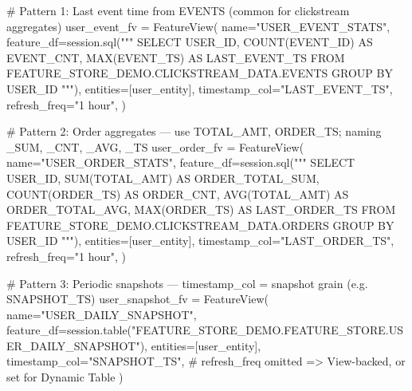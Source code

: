 \documentclass[
  letterpaper,
  DIV=11,
  numbers=noendperiod]{scrreprt}
\newenvironment{Shaded}{\begin{snugshade}}{\end{snugshade}}
\newcommand{\CommentTok}[1]{\textcolor[rgb]{0.37,0.37,0.37}{#1}}
\newcommand{\NormalTok}[1]{\textcolor[rgb]{0.00,0.23,0.31}{#1}}
\newcommand{\OperatorTok}[1]{\textcolor[rgb]{0.37,0.37,0.37}{#1}}
\newcommand{\StringTok}[1]{\textcolor[rgb]{0.13,0.47,0.30}{#1}}
\begin{document}
\begin{Shaded}
\begin{Highlighting}[]
\CommentTok{\# Pattern 1: Last event time from EVENTS (common for clickstream aggregates)}
\NormalTok{user\_event\_fv }\OperatorTok{=}\NormalTok{ FeatureView(}
\NormalTok{    name}\OperatorTok{=}\StringTok{"USER\_EVENT\_STATS"}\NormalTok{,}
\NormalTok{    feature\_df}\OperatorTok{=}\NormalTok{session.sql(}\StringTok{"""}
\StringTok{        SELECT}
\StringTok{            USER\_ID,}
\StringTok{            COUNT(EVENT\_ID) AS EVENT\_CNT,}
\StringTok{            MAX(EVENT\_TS) AS LAST\_EVENT\_TS}
\StringTok{        FROM FEATURE\_STORE\_DEMO.CLICKSTREAM\_DATA.EVENTS}
\StringTok{        GROUP BY USER\_ID}
\StringTok{    """}\NormalTok{),}
\NormalTok{    entities}\OperatorTok{=}\NormalTok{[user\_entity],}
\NormalTok{    timestamp\_col}\OperatorTok{=}\StringTok{"LAST\_EVENT\_TS"}\NormalTok{,}
\NormalTok{    refresh\_freq}\OperatorTok{=}\StringTok{"1 hour"}\NormalTok{,}
\NormalTok{)}

\CommentTok{\# Pattern 2: Order aggregates — use TOTAL\_AMT, ORDER\_TS; naming \_SUM, \_CNT, \_AVG, \_TS}
\NormalTok{user\_order\_fv }\OperatorTok{=}\NormalTok{ FeatureView(}
\NormalTok{    name}\OperatorTok{=}\StringTok{"USER\_ORDER\_STATS"}\NormalTok{,}
\NormalTok{    feature\_df}\OperatorTok{=}\NormalTok{session.sql(}\StringTok{"""}
\StringTok{        SELECT}
\StringTok{            USER\_ID,}
\StringTok{            SUM(TOTAL\_AMT) AS ORDER\_TOTAL\_SUM,}
\StringTok{            COUNT(ORDER\_TS) AS ORDER\_CNT,}
\StringTok{            AVG(TOTAL\_AMT) AS ORDER\_TOTAL\_AVG,}
\StringTok{            MAX(ORDER\_TS) AS LAST\_ORDER\_TS}
\StringTok{        FROM FEATURE\_STORE\_DEMO.CLICKSTREAM\_DATA.ORDERS}
\StringTok{        GROUP BY USER\_ID}
\StringTok{    """}\NormalTok{),}
\NormalTok{    entities}\OperatorTok{=}\NormalTok{[user\_entity],}
\NormalTok{    timestamp\_col}\OperatorTok{=}\StringTok{"LAST\_ORDER\_TS"}\NormalTok{,}
\NormalTok{    refresh\_freq}\OperatorTok{=}\StringTok{"1 hour"}\NormalTok{,}
\NormalTok{)}

\CommentTok{\# Pattern 3: Periodic snapshots — timestamp\_col = snapshot grain (e.g. SNAPSHOT\_TS)}
\NormalTok{user\_snapshot\_fv }\OperatorTok{=}\NormalTok{ FeatureView(}
\NormalTok{    name}\OperatorTok{=}\StringTok{"USER\_DAILY\_SNAPSHOT"}\NormalTok{,}
\NormalTok{    feature\_df}\OperatorTok{=}\NormalTok{session.table(}\StringTok{"FEATURE\_STORE\_DEMO.FEATURE\_STORE.USER\_DAILY\_SNAPSHOT"}\NormalTok{),}
\NormalTok{    entities}\OperatorTok{=}\NormalTok{[user\_entity],}
\NormalTok{    timestamp\_col}\OperatorTok{=}\StringTok{"SNAPSHOT\_TS"}\NormalTok{,}
    \CommentTok{\# refresh\_freq omitted =\textgreater{} View{-}backed, or set for Dynamic Table}
\NormalTok{)}
\end{Highlighting}
\end{Shaded}
\end{document}
